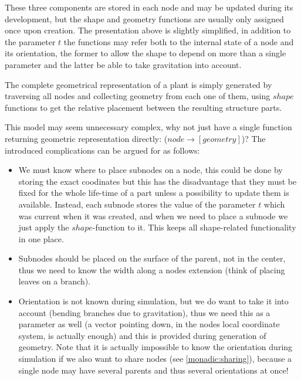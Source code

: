     These three components are stored in each node and may be updated
    during its development, but the shape and geometry functions are
    usually only assigned once upon creation. The presentation above
    is slightly simplified, in addition to the parameter $t$ the
    functions may refer both to the internal state of a node and its
    orientation, the former to allow the shape to depend on more than
    a single parameter and the latter be able to take gravitation into
    account. 

    The complete geometrical representation of a plant is simply
    generated by traversing all nodes and collecting geometry from
    each one of them, using $\mathit{shape}$ functions to get the
    relative placement between the resulting structure parts.


    This model may seem unnecessary complex, why not just have a
    single function returning geometric representation directly:
    ($ \mathit{node} \rightarrow [\mathit{geometry}] $)? 
    The introduced complications can be argued for as follows:
\begin{itemize}
\item We must know where to place subnodes on a node, this could be
        done by storing the exact coodinates but this has the disadvantage
        that they must be fixed for the whole life-time of a part
        unless a possibility to update them is available. Instead,
        each subnode stores the value of the parameter $t$ which was
        current when it was created, and when we need to place a
        subnode we just apply the $\mathit{shape}$-function to it.
        This keeps all shape-related functionality in one place.

\item Subnodes should be placed on the
        surface of the parent, not in the center, thus we need to know the
        width along a nodes extension (think of placing leaves on a branch).

\item Orientation is not known during simulation, but we do want to
        take it into account (bending branches due to gravitation),
        thus we need this as a parameter as well (a vector pointing
        down, in the nodes local coordinate system, is actually
        enough) and this is provided during generation of geometry.
        Note that it is actually impossible to know the orientation
        during simulation if we also want to share nodes (see
        \ref{monadic:sharing}), because a single node may have several
        parents and thus several orientations at once!

\end{itemize}


